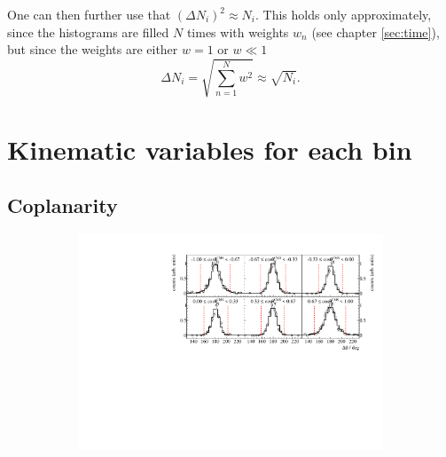 One can then further use that $\left(\Delta N_i\right)^2  \approx N_i$. This holds only approximately, since the histograms are filled $N$ times with weights $w_n$ (see chapter \ref{sec:time}), but since the weights are either $w=1$ or $w\ll1$
\begin{equation}
	\Delta N_i=\sqrt{\sum_{n=1}^N w^2}\approx\sqrt{N_i}.
\end{equation}
\newpage
\section{Kinematic variables for each bin}
\label{sec:kinv}
\subsection{Coplanarity}
\begin{figure}[H]
	\centering
	\begin{subfigure}{\linewidth}
		\includegraphics[width=\linewidth]{../figs/hydrogen/bin_cuts/phicut_ebin1.pdf}
	\end{subfigure}


\end{figure}
